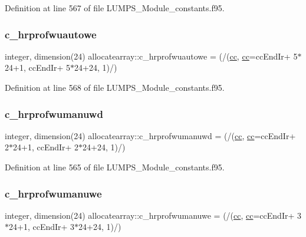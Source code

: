 Definition at line 567 of file L\+U\+M\+P\+S\+\_\+\+Module\+\_\+constants.\+f95.

\mbox{\label{namespaceallocatearray_ada575a8a824d37b4f6d017091a08376d}} 
\subsubsection{\texorpdfstring{c\+\_\+hrprofwuautowe}{c\_hrprofwuautowe}}
{\footnotesize\ttfamily integer, dimension(24) allocatearray\+::c\+\_\+hrprofwuautowe = (/(\hyperlink{namespaceallocatearray_ac863c81704eb507dee10f5e10741e10c}{cc}, \hyperlink{namespaceallocatearray_ac863c81704eb507dee10f5e10741e10c}{cc}=cc\+End\+Ir+ 5$\ast$24+1, cc\+End\+Ir+ 5$\ast$24+24, 1)/)}



Definition at line 568 of file L\+U\+M\+P\+S\+\_\+\+Module\+\_\+constants.\+f95.

\mbox{\label{namespaceallocatearray_aa110accf8ca7f9ce8f65084bb3dfaf2d}} 
\subsubsection{\texorpdfstring{c\+\_\+hrprofwumanuwd}{c\_hrprofwumanuwd}}
{\footnotesize\ttfamily integer, dimension(24) allocatearray\+::c\+\_\+hrprofwumanuwd = (/(\hyperlink{namespaceallocatearray_ac863c81704eb507dee10f5e10741e10c}{cc}, \hyperlink{namespaceallocatearray_ac863c81704eb507dee10f5e10741e10c}{cc}=cc\+End\+Ir+ 2$\ast$24+1, cc\+End\+Ir+ 2$\ast$24+24, 1)/)}



Definition at line 565 of file L\+U\+M\+P\+S\+\_\+\+Module\+\_\+constants.\+f95.

\mbox{\label{namespaceallocatearray_a8c6488d8e54bce9b139d4a7a755da8aa}} 
\subsubsection{\texorpdfstring{c\+\_\+hrprofwumanuwe}{c\_hrprofwumanuwe}}
{\footnotesize\ttfamily integer, dimension(24) allocatearray\+::c\+\_\+hrprofwumanuwe = (/(\hyperlink{namespaceallocatearray_ac863c81704eb507dee10f5e10741e10c}{cc}, \hyperlink{namespaceallocatearray_ac863c81704eb507dee10f5e10741e10c}{cc}=cc\+End\+Ir+ 3$\ast$24+1, cc\+End\+Ir+ 3$\ast$24+24, 1)/)}




